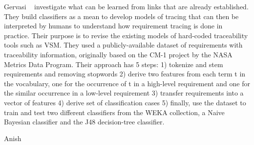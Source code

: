 Gervasi \etal~\cite{Gervasi:2011} investigate what can be learned from links that are already established. They build classifiers as a mean to develop models of tracing that can then be interpreted by humans to understand how requirement tracing is done in practice. Their purpose is to revise the existing models of hard-coded traceability tools such as VSM. 
They used a publicly-available dataset of requirements with traceability information, originally based on the CM-1 project by the NASA Metrics Data Program. Their approach has 5 steps: 1) tokenize and stem requirements and removing stopwords 2) derive two features from each term t in the vocabulary, one for the occurrence of t in a high-level requirement and one for the similar occurrence in a low-level requirement 3) transfer requirements into a vector of features 4) derive set of classification cases 5) finally,  use the dataset to train and test two different classifiers from the WEKA collection, a Naive Bayesian classifier and the J48 decision-tree classifier.\newline


Anish \etal~\cite{Anish:2016} 

\cite{Sultanov:2013}



